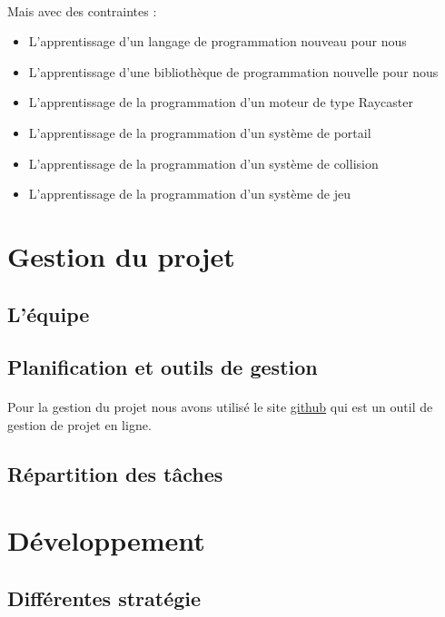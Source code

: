 \documentclass[12pt]{report}
\begin{document}
\paragraph{}
Mais avec des contraintes :
\begin{itemize}
	\item L'apprentissage d'un langage de programmation nouveau pour nous
	\item L'apprentissage d'une bibliothèque de programmation nouvelle pour nous
	\item L'apprentissage de la programmation d'un moteur de type Raycaster
	\item L'apprentissage de la programmation d'un système de portail
	\item L'apprentissage de la programmation d'un système de collision
	\item L'apprentissage de la programmation d'un système de jeu
\end{itemize}

\section{Gestion du projet}
\subsection{L'équipe}
\subsection{Planification et outils de gestion}

\paragraph{}
Pour la gestion du projet nous avons utilisé le site 
\href{https://github.com/}{github} qui est un outil de gestion 
de projet en ligne.

\subsection{Répartition des tâches}

\section{Développement}
\subsection{Différentes stratégie}
\end{document}
